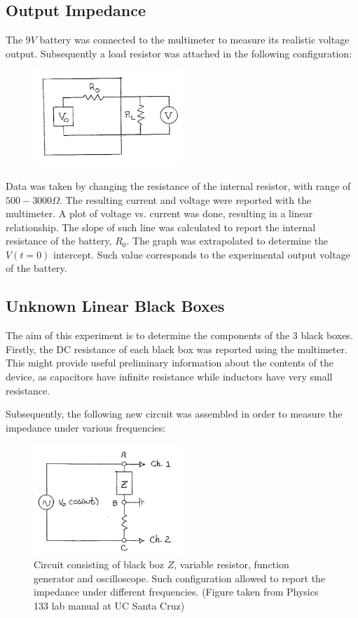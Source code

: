 \documentclass[a4paper]{article}
\begin{document}
\subsection{Output Impedance}
The $9V$ battery was connected to the multimeter to measure its realistic voltage output. Subsequently a load resistor was attached in the following configuration:
\begin{figure}[h]
\centering
\includegraphics[width=0.5\textwidth]{voltagesource}
\end{figure}
Data was taken by changing the resistance of the internal resistor, with range of $500-3000\Omega$. The resulting current and voltage were reported with the multimeter. A plot of voltage vs. current was done, resulting in a linear relationship. The slope of such line was calculated to report the internal resistance of the battery, $R_0$. The graph was extrapolated to determine the $V(t=0)$ intercept. Such value corresponds to the experimental output voltage of the battery.

\subsection{Unknown Linear Black Boxes}
The aim of this experiment is to determine the components of the 3 black boxes. Firstly, the DC resistance of each black box was reported using the multimeter. This might provide useful preliminary information about the contents of the device, as capacitors have infinite resistance while inductors have very small resistance.

Subsequently, the following new circuit was assembled in order to measure the impedance under various frequencies:
 \begin{figure}[h]
\centering
\includegraphics[width=0.5\textwidth]{zcircuit}
\caption{Circuit consisting of black boz $Z$, variable resistor, function generator and oscilloscope. Such configuration allowed to report the impedance under different frequencies. (Figure taken from Physics 133 lab manual at UC Santa Cruz)}
\end{figure}
\end{document}
